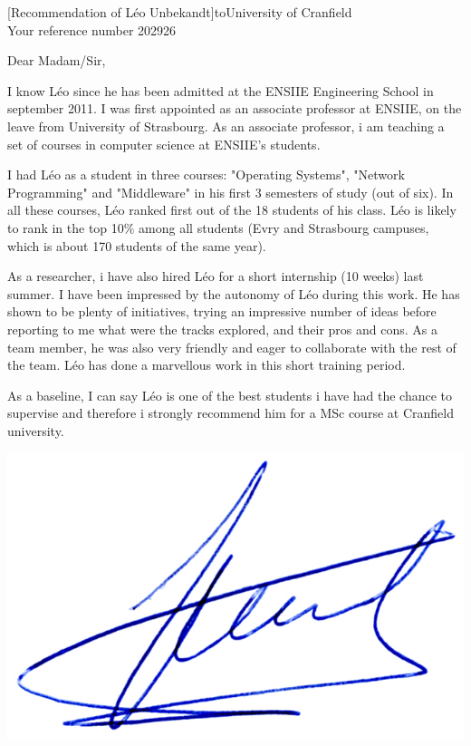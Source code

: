 \documentclass[a4paper,10pt]{article}
\begin{document}

\begin{letter}[Recommendation of Léo Unbekandt]{to}{University of Cranfield\\Your reference number 202926}

Dear Madam/Sir, 

I know Léo since he has been admitted at the ENSIIE Engineering School in september 2011.
I was first appointed as an associate professor at ENSIIE, on the leave from University of Strasbourg.
As an associate professor, i am teaching a set of courses in computer science at ENSIIE's students.

I had Léo as a student in three courses: "Operating Systems", "Network Programming" and "Middleware"
in his first 3 semesters of study (out of six). In all these courses, Léo ranked first out of the
18 students of his class. Léo is likely to rank in the top 10\% among all students (Evry and Strasbourg
campuses, which is about 170 students of the same year).

As a researcher, i have also hired Léo for a short internship (10 weeks) last summer. I have been
impressed by the autonomy of Léo during this work. He has shown to be plenty of initiatives,
trying an impressive number of ideas before reporting to me what were the tracks explored,
and their pros and cons. As a team member, he was also very friendly and eager to 
collaborate with the rest of the team. Léo has done a marvellous work in this short
training period.

As a baseline, I can say Léo is one of the best students i have had the chance to 
supervise and therefore i strongly recommend him for a MSc course at Cranfield university.

\end{letter}
\begin{flushright}
\includegraphics[width=.26\textwidth]{signgenaud.jpg}
\end{flushright}
%
%
\end{document}
